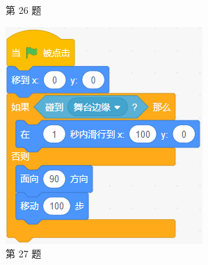 \documentclass[10pt, a4paper]{article}
\begin{document}
\begin{enumerate}
\begin{figure}[htbp]
\begin{minipage}[t]{.13\textwidth}
                \caption*{第 26 题}
            \end{minipage}
            \begin{minipage}[t]{.26\textwidth}
                \centering
                \includegraphics[width=\textwidth]{figure/27.png}
                \caption*{第 27 题}
            \end{minipage}
            \begin{minipage}[t]{.15\textwidth}
                \centering

\end{minipage}
\end{figure}
\end{enumerate}
\end{document}
